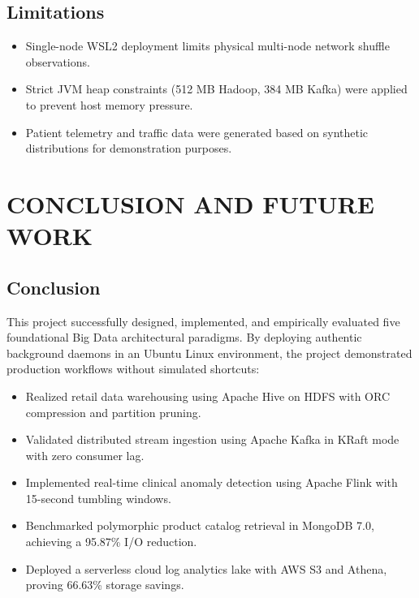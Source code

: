 \documentclass[12pt,a4paper]{report}
\begin{document}
\section{Limitations}
\begin{itemize}
    \item Single-node WSL2 deployment limits physical multi-node network shuffle observations.
    \item Strict JVM heap constraints (512 MB Hadoop, 384 MB Kafka) were applied to prevent host memory pressure.
    \item Patient telemetry and traffic data were generated based on synthetic distributions for demonstration purposes.
\end{itemize}

\clearpage

\chapter{CONCLUSION AND FUTURE WORK}

\section{Conclusion}
This project successfully designed, implemented, and empirically evaluated five foundational Big Data architectural paradigms. By deploying authentic background daemons in an Ubuntu Linux environment, the project demonstrated production workflows without simulated shortcuts:
\begin{itemize}
    \item Realized retail data warehousing using Apache Hive on HDFS with ORC compression and partition pruning.
    \item Validated distributed stream ingestion using Apache Kafka in KRaft mode with zero consumer lag.
    \item Implemented real-time clinical anomaly detection using Apache Flink with 15-second tumbling windows.
    \item Benchmarked polymorphic product catalog retrieval in MongoDB 7.0, achieving a 95.87\% I/O reduction.
    \item Deployed a serverless cloud log analytics lake with AWS S3 and Athena, proving 66.63\% storage savings.
\end{itemize}
\end{document}
